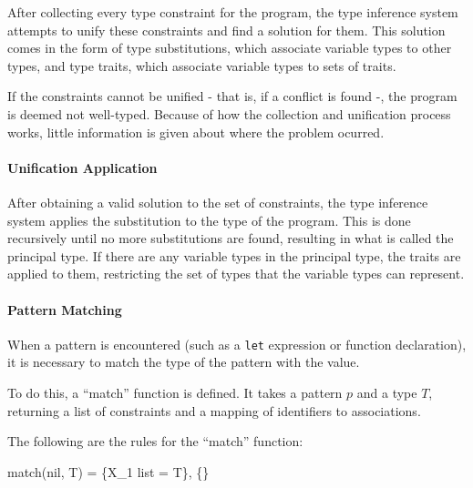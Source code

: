 \documentclass{article}
\begin{document}
After collecting every type constraint for the program, the type inference system attempts to unify these constraints and find a solution for them.
This solution comes in the form of type substitutions, which associate variable types to other types, and type traits, which associate variable types to sets of traits.

If the constraints cannot be unified - that is, if a conflict is found -, the program is deemed not well-typed.
Because of how the collection and unification process works, little information is given about where the problem ocurred.

\paragraph{Unification Application}

After obtaining a valid solution to the set of constraints, the type inference system applies the substitution to the type of the program.
This is done recursively until no more substitutions are found, resulting in what is called the principal type.
If there are any variable types in the principal type, the traits are applied to them, restricting the set of types that the variable types can represent.

\paragraph{Pattern Matching}

When a pattern is encountered (such as a \texttt{let} expression or function declaration), it is necessary to match the type of the pattern with the value.

To do this, a ``match'' function is defined.
It takes a pattern $p$ and a type $T$, returning a list of constraints and a mapping of identifiers to associations.

The following are the rules for the ``match'' function:





\smallskip

    {match(nil, T) = \{X_1 list = T\}, \{\}}
\end{document}
